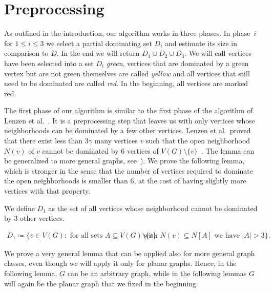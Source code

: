 
\section{Preprocessing}\label{sec:step1}

As outlined in the introduction, our algorithm works in three phases.
In phase~$i$ for $1\leq i\leq 3$ we select a partial dominating set
$D_i$ and estimate its size in comparison to $D$. In the end we will
return $D_1\cup D_2\cup D_3$. We will call vertices have been selected
into a set $D_i$ \emph{green}, vertices that are dominated by a green
vertex but are not green themselves are called \emph{yellow} and all
vertices that still need to be dominated are called \emph{red}. In the
beginning, all vertices are marked red.

The first phase of our algorithm is similar to the first phase of the
algorithm of Lenzen et al.~\cite{lenzen2013distributed}. It is a
preprocessing step that leaves us with only vertices whose
neighborhoods can be dominated by a few other vertices. Lenzen et al.\
proved that there exist less than $3\gamma$
many vertices $v$ such
that the open neighborhood $N(v)$ of $v$ cannot be dominated by $6$
vertices of $V(G)\setminus \{v\}$~\cite[Lemma
6.3]{lenzen2013distributed}. The lemma can be generalized to more
general graphs, see~\cite{amiri2019distributed}). We prove the
following lemma, which is stronger in the sense that the number of
vertices required to dominate the open neighborhoods is smaller than
$6$, at the cost of having slightly more vertices with that property.

\smallskip We define $D_1$ as the set of all vertices whose
neighborhood cannot be dominated by $3$ other vertices.
\begin{tcolorbox}[colback=red!5!white,colframe=red!50!black]
\vspace{-4mm}
  \begin{align*}
  D_1\coloneqq \{v\in V(G) : \text{ for all sets } A\subseteq V(G)\setminus \{v\}
  & \text{ with $N(v)\subseteq N[A]$ we have $|A|> 3\}$.}
  \end{align*}
\end{tcolorbox}

\smallskip

We prove a very general lemma that can be applied also for more
general graph classes, even though we will apply it only for planar
graphs.  Hence, in the following lemma, $G$ can be an arbitrary graph,
while in the following lemmas $G$ will again be the planar graph that
we fixed in the beginning.


